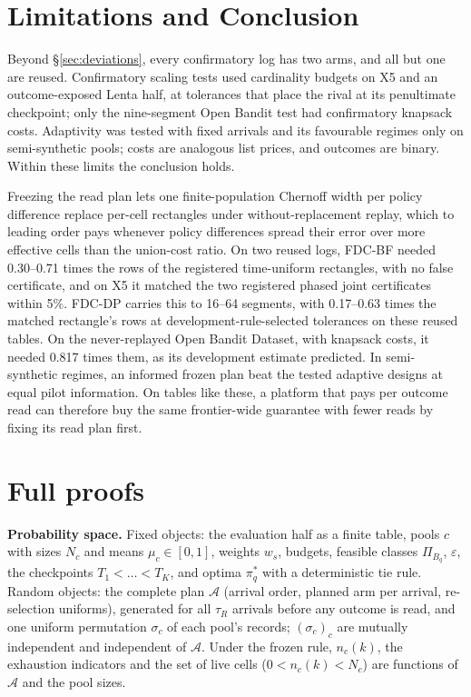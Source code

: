 \documentclass[sigconf,anonymous,review]{acmart}
\newcommand{\cA}{\mathcal{A}}
\newcommand{\eps}{\varepsilon}
\begin{document}
\section{Limitations and Conclusion}\label{sec:conclusion}

Beyond \S\ref{sec:deviations}, every confirmatory log has two arms, and all but one are reused. Confirmatory scaling tests used cardinality budgets on X5 and an outcome-exposed Lenta half, at tolerances that place the rival at its penultimate checkpoint; only the nine-segment Open Bandit test had confirmatory knapsack costs. Adaptivity was tested with fixed arrivals and its favourable regimes only on semi-synthetic pools; costs are analogous list prices, and outcomes are binary. Within these limits the conclusion holds.

Freezing the read plan lets one finite-population Chernoff width per policy difference replace per-cell rectangles under without-replacement replay, which to leading order pays whenever policy differences spread their error over more effective cells than the union-cost ratio. On two reused logs, FDC-BF needed 0.30--0.71 times the rows of the registered time-uniform rectangles, with no false certificate, and on X5 it matched the two registered phased joint certificates within 5\%. FDC-DP carries this to 16--64 segments, with 0.17--0.63 times the matched rectangle's rows at development-rule-selected tolerances on these reused tables. On the never-replayed Open Bandit Dataset, with knapsack costs, it needed 0.817 times them, as its development estimate predicted. In semi-synthetic regimes, an informed frozen plan beat the tested adaptive designs at equal pilot information. On tables like these, a platform that pays per outcome read can therefore buy the same frontier-wide guarantee with fewer reads by fixing its read plan first.




\appendix
\setcounter{table}{0}
\renewcommand{\thetable}{A\arabic{table}}
\setcounter{figure}{0}
\renewcommand{\thefigure}{A\arabic{figure}}

\section{Full proofs}\label{app:proofs}

\textbf{Probability space.} Fixed objects: the evaluation half as a finite table, pools $c$ with sizes $N_c$ and means $\mu_c \in [0,1]$, weights $w_s$, budgets, feasible classes $\Pi_{B_q}$, $\eps$, the checkpoints $T_1 < \dots < T_K$, and optima $\pi^*_q$ with a deterministic tie rule. Random objects: the complete plan $\cA$ (arrival order, planned arm per arrival, re-selection uniforms), generated for all $\tau_R$ arrivals before any outcome is read, and one uniform permutation $\sigma_c$ of each pool's records; $(\sigma_c)_c$ are mutually independent and independent of $\cA$. Under the frozen rule, $n_c(k)$, the exhaustion indicators and the set of live cells ($0 < n_c(k) < N_c$) are functions of $\cA$ and the pool sizes.
\end{document}
